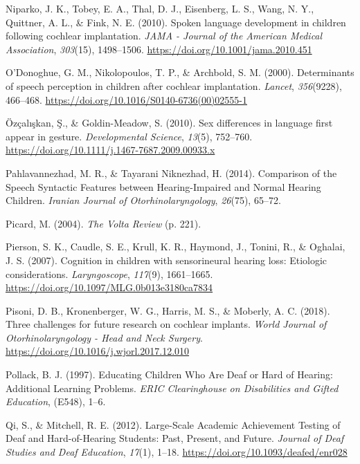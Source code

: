 \documentclass[english,man]{apa6}
\begin{document}
\leavevmode\hypertarget{ref-niparko2010}{}%
Niparko, J. K., Tobey, E. A., Thal, D. J., Eisenberg, L. S., Wang, N. Y., Quittner, A. L., \& Fink, N. E. (2010). Spoken language development in children following cochlear implantation. \emph{JAMA - Journal of the American Medical Association}, \emph{303}(15), 1498--1506. \url{https://doi.org/10.1001/jama.2010.451}

\leavevmode\hypertarget{ref-odonoghue2000}{}%
O'Donoghue, G. M., Nikolopoulos, T. P., \& Archbold, S. M. (2000). Determinants of speech perception in children after cochlear implantation. \emph{Lancet}, \emph{356}(9228), 466--468. \url{https://doi.org/10.1016/S0140-6736(00)02555-1}

\leavevmode\hypertarget{ref-ozcaliskan2010}{}%
Özçalışkan, Ş., \& Goldin-Meadow, S. (2010). Sex differences in language first appear in gesture. \emph{Developmental Science}, \emph{13}(5), 752--760. \url{https://doi.org/10.1111/j.1467-7687.2009.00933.x}

\leavevmode\hypertarget{ref-pahlavannezhad2014}{}%
Pahlavannezhad, M. R., \& Tayarani Niknezhad, H. (2014). Comparison of the Speech Syntactic Features between Hearing-Impaired and Normal Hearing Children. \emph{Iranian Journal of Otorhinolaryngology}, \emph{26}(75), 65--72.

\leavevmode\hypertarget{ref-picard2004}{}%
Picard, M. (2004). \emph{The Volta Review} (p. 221).

\leavevmode\hypertarget{ref-pierson2007}{}%
Pierson, S. K., Caudle, S. E., Krull, K. R., Haymond, J., Tonini, R., \& Oghalai, J. S. (2007). Cognition in children with sensorineural hearing loss: Etiologic considerations. \emph{Laryngoscope}, \emph{117}(9), 1661--1665. \url{https://doi.org/10.1097/MLG.0b013e3180ca7834}

\leavevmode\hypertarget{ref-pisoni2018}{}%
Pisoni, D. B., Kronenberger, W. G., Harris, M. S., \& Moberly, A. C. (2018). Three challenges for future research on cochlear implants. \emph{World Journal of Otorhinolaryngology - Head and Neck Surgery}. \url{https://doi.org/10.1016/j.wjorl.2017.12.010}

\leavevmode\hypertarget{ref-pollack1997}{}%
Pollack, B. J. (1997). Educating Children Who Are Deaf or Hard of Hearing: Additional Learning Problems. \emph{ERIC Clearinghouse on Disabilities and Gifted Education}, (E548), 1--6.

\leavevmode\hypertarget{ref-qi2012}{}%
Qi, S., \& Mitchell, R. E. (2012). Large-Scale Academic Achievement Testing of Deaf and Hard-of-Hearing Students: Past, Present, and Future. \emph{Journal of Deaf Studies and Deaf Education}, \emph{17}(1), 1--18. \url{https://doi.org/10.1093/deafed/enr028}
\end{document}
